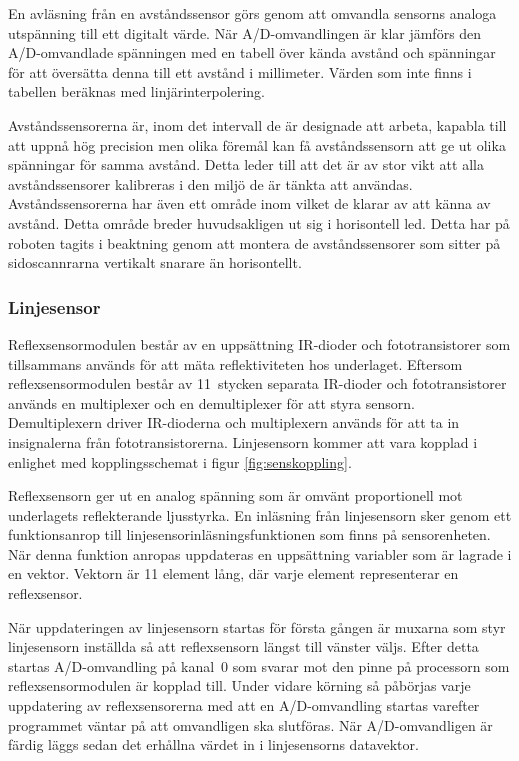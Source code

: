 En avläsning från en avståndssensor görs genom att omvandla sensorns analoga utspänning till ett digitalt värde. När A/D-omvandlingen är klar jämförs den A/D-omvandlade spänningen med en tabell över kända avstånd och spänningar för att översätta denna till ett avstånd i millimeter. Värden som inte finns i tabellen beräknas med linjärinterpolering. 

Avståndssensorerna är, inom det intervall de är designade att arbeta, kapabla till att uppnå hög precision men olika föremål kan få avståndssensorn att ge ut olika spänningar för samma avstånd. Detta leder till att det är av stor vikt att alla avståndssensorer kalibreras i den miljö de är tänkta att användas. Avståndssensorerna har även ett område inom vilket de klarar av att känna av avstånd. Detta område breder huvudsakligen ut sig i horisontell led. Detta har på roboten tagits i beaktning genom att montera de avståndssensorer som sitter på sidoscannrarna vertikalt snarare än horisontellt.

\subsubsection{Linjesensor}
Reflexsensormodulen består av en uppsättning IR-dioder och fototransistorer som tillsammans används för att mäta reflektiviteten hos underlaget. Eftersom reflexsensormodulen består av 11~stycken separata IR-dioder och fototransistorer används en multiplexer och en demultiplexer för att styra sensorn. Demultiplexern driver IR-dioderna och multiplexern används för att ta in insignalerna från fototransistorerna. Linjesensorn kommer att vara kopplad i enlighet med kopplingsschemat i figur \ref{fig:senskoppling}.

Reflexsensorn ger ut en analog spänning som är omvänt proportionell mot underlagets reflekterande ljusstyrka. En inläsning från linjesensorn sker genom ett funktionsanrop till linjesensorinläsningsfunktionen som finns på sensorenheten. När denna funktion anropas uppdateras en uppsättning variabler som är lagrade i en vektor. Vektorn är 11 element lång, där varje element representerar en reflexsensor.

När uppdateringen av linjesensorn startas för första gången är muxarna som styr linjesensorn inställda så att reflexsensorn längst till vänster väljs. Efter detta startas A/D-omvandling på kanal~0 som svarar mot den pinne på processorn som reflexsensormodulen är kopplad till. Under vidare körning så påbörjas varje uppdatering av reflexsensorerna med att en A/D-omvandling startas varefter programmet väntar på att omvandligen ska slutföras. När A/D-omvandligen är färdig läggs sedan det erhållna värdet in i linjesensorns datavektor.


